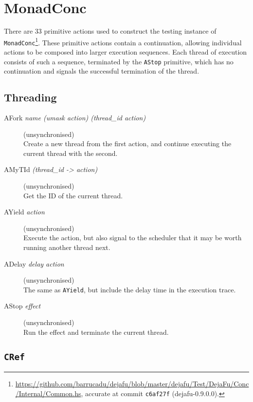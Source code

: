 \section{MonadConc}
\label{app:primops-conc}

\newcommand{\defineprim}[3]{\item[#1 \textit{#2}] \hfill (#3)\\}

There are 33 primitive actions used to construct the testing instance of
\verb|MonadConc|\footnote{\url{https://github.com/barrucadu/dejafu/blob/master/dejafu/Test/DejaFu/Conc/Internal/Common.hs}, accurate at commit \texttt{c6af27f} (dejafu-0.9.0.0).}.
These primitive actions contain a continuation, allowing individual actions to
be composed into larger execution sequences.  Each thread of execution consists
of such a sequence, terminated by the \verb|AStop| primitive, which has no
continuation and signals the successful termination of the thread.

\subsection{Threading}

\begin{description}
\defineprim{AFork}{name (umask \arr action) (thread\_id \arr action)}{unsynchronised}
  Create a new thread from the first action, and continue executing the
  current thread with the second.

\defineprim{AMyTId}{(thread\_id -> action)}{unsynchronised}
  Get the ID of the current thread.

\defineprim{AYield}{action}{unsynchronised}
  Execute the action, but also signal to the scheduler that it may be worth
  running another thread next.

\defineprim{ADelay}{delay action}{unsynchronised}
  The same as \texttt{AYield}, but include the delay time in the execution
  trace.

\defineprim{AStop}{effect}{unsynchronised}
  Run the effect and terminate the current thread.
\end{description}

\subsection{\texttt{CRef}}

